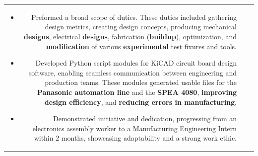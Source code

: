 \documentclass[allblack]{simplehipstercv}
\begin{document}
\begin{paracol}{2}
\begin{tabular}{r| p{} c}
{\begin{itemize}
            \item Preformed a broad scope of duties. These duties included gathering design metrics, creating design concepts, producing mechanical \textbf{designs},
            electrical \textbf{designs}, fabrication (\textbf{buildup}), optimization, and \textbf{modification} of various \textbf{experimental} test fixures and tools.  
            \item Developed Python script modules for KiCAD circuit board design software, enabling seamless communication between engineering and production teams. 
            These modules generated usable files for the \textbf{Panasonic automation line} and the \textbf{SPEA 4080}, \textbf{improving design efficiency}, and \textbf{reducing errors in manufacturing}.
            \item Demonstrated initiative and dedication, progressing from an electronics assembly worker to a Manufacturing Engineering Intern within 2 months, 
            showcasing adaptability and a strong work ethic. 
        \end{itemize}
    }
\end{tabular}
\newpage

\end{paracol}
\end{document}
